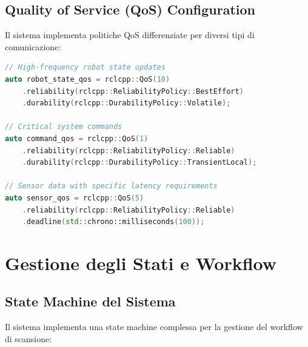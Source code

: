 \documentclass[12pt,a4paper,twoside,openright]{book}
\begin{document}
\subsection{Quality of Service (QoS) Configuration}

Il sistema implementa politiche QoS differenziate per diversi tipi di comunicazione:

\begin{lstlisting}[language=C++, caption={Configurazione QoS per diversi topic}]
// High-frequency robot state updates
auto robot_state_qos = rclcpp::QoS(10)
    .reliability(rclcpp::ReliabilityPolicy::BestEffort)
    .durability(rclcpp::DurabilityPolicy::Volatile);

// Critical system commands
auto command_qos = rclcpp::QoS(1)
    .reliability(rclcpp::ReliabilityPolicy::Reliable)
    .durability(rclcpp::DurabilityPolicy::TransientLocal);

// Sensor data with specific latency requirements
auto sensor_qos = rclcpp::QoS(5)
    .reliability(rclcpp::ReliabilityPolicy::Reliable)
    .deadline(std::chrono::milliseconds(100));
\end{lstlisting}

\section{Gestione degli Stati e Workflow}

\subsection{State Machine del Sistema}

Il sistema implementa una state machine complessa per la gestione del workflow di scansione:
\end{document}
